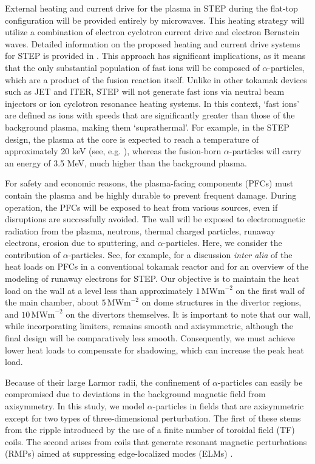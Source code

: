 \documentclass[10pt, a4paper, twoside]{article}
\begin{document}
External heating and current drive for the plasma in STEP during the flat-top configuration will be provided entirely by microwaves. This heating strategy will utilize a combination of electron cyclotron current drive and electron Bernstein waves. Detailed information on the proposed heating and current drive systems for STEP is provided in \cite{freethy2023}.
This approach has significant implications, as it means that the only substantial population of fast ions will be composed of $\alpha$-particles, which are a product of the fusion reaction itself. Unlike in other tokamak devices such as JET and ITER, STEP will not generate fast ions via neutral beam injectors or ion cyclotron resonance heating systems.
In this context, `fast ions' are defined as ions with speeds that are significantly greater than those of the background plasma, making them `suprathermal'. For example, in the STEP design, the plasma at the core is expected to reach a temperature of approximately 20 keV (see, e.g. \cite{meyer2023,mitchell2023}), whereas the fusion-born $\alpha$-particles will carry an energy of 3.5 MeV, much higher than the background plasma.

For safety and economic reasons, the plasma-facing components (PFCs) must contain the plasma and be highly durable to prevent frequent damage. During operation, the PFCs will be exposed to heat from various sources, even if disruptions are successfully avoided. The wall will be exposed to electromagnetic radiation from the plasma, neutrons, thermal charged particles, runaway electrons, erosion due to sputtering, and $\alpha$-particles. Here, we consider the contribution of $\alpha$-particles. See, for example, \cite{bachmann2018} for a discussion {\it inter alia} of the heat loads on PFCs in a conventional tokamak reactor and \cite{fil2023} for an overview of the modeling of runaway electrons for STEP. Our objective is to maintain the heat load on the wall at a level less than approximately $1\, \text{MWm}^{-2}$ on the first wall of the main chamber, about $5\, \text{MWm}^{-2}$ on dome structures in the divertor regions, and $10\, \text{MWm}^{-2}$ on the divertors themselves. It is important to note that our wall, while incorporating limiters, remains smooth and axisymmetric, although the final design will be comparatively less smooth. Consequently, we must achieve lower heat loads to compensate for shadowing, which can increase the peak heat load.

Because of their large Larmor radii, the confinement of $\alpha$-particles can easily be compromised due to deviations in the background magnetic field from axisymmetry.  In this study, we model $\alpha$-particles in fields that are axisymmetric except for two types of three-dimensional perturbation. The first of these stems from the ripple introduced by the use of a finite number of toroidal field (TF) coils. The second arises from coils that generate resonant magnetic perturbations (RMPs) aimed at suppressing edge-localized modes (ELMs) \cite{zohm1996}.
\end{document}
